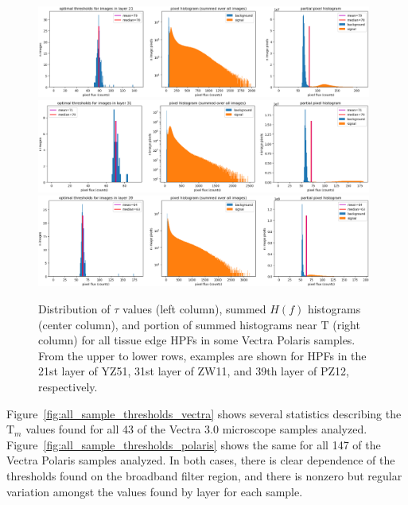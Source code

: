 \documentclass[letterpaper,11pt]{article}
\newcommand{\reffig}[1]{Figure~\ref{#1}}
\newcommand{\Tau}{\mathrm{T}}
\begin{document}
\begin{figure}[!ht]
\centering
\includegraphics[width=0.98\textwidth]{images/masking/YZ51_layer_21_background_threshold_plots}
\includegraphics[width=0.98\textwidth]{images/masking/ZW11_layer_31_background_threshold_plots}
\includegraphics[width=0.98\textwidth]{images/masking/PZ12_layer_39_background_threshold_plots}
\caption{\footnotesize Distribution of $\tau$ values (left column), summed $H(f)$ histograms (center column), and portion of summed histograms near $\Tau$ (right column) for all tissue edge HPFs in some Vectra Polaris samples. From the upper to lower rows, examples are shown for HPFs in the 21st layer of YZ51, 31st layer of ZW11, and 39th layer of PZ12, respectively.}
\label{fig:threshold_distributions_polaris_2}
\end{figure}

\reffig{fig:all_sample_thresholds_vectra} shows several statistics describing the $\Tau_{m}$ values found for all 43 of the Vectra 3.0 microscope samples analyzed. \reffig{fig:all_sample_thresholds_polaris} shows the same for all 147 of the Vectra Polaris samples analyzed. In both cases, there is clear dependence of the thresholds found on the broadband filter region, and there is nonzero but regular variation amongst the values found by layer for each sample.
\end{document}
